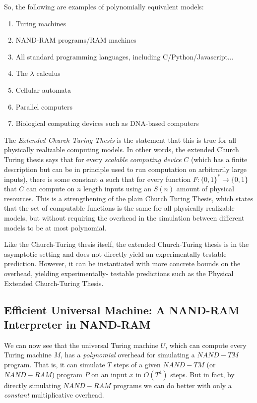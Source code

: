 \documentclass[a4paper, 12pt]{report}
\theoremstyle{remark}
\theoremstyle{definition}
\begin{document}
So, the following are examples of polynomially equivalent models: 
\begin{enumerate}
    \item Turing machines
    \item NAND-RAM programs/RAM machines
    \item All standard programming languages, including C/Python/Javascript...
    \item The $\lambda$ calculus
    \item Cellular automata
    \item Parallel computers
    \item Biological computing devices such as DNA-based computers 
\end{enumerate}

The \textit{Extended Church Turing Thesis} is the statement that this is true for all physically realizable computing models. In other words, the extended Church Turing thesis says that for every \textit{scalable computing device} $C$ (which has a finite description but can be in principle used to run computation on arbitrarily large inputs), there is some constant $a$ such that for every function $F: \{0,1\}^* \longrightarrow \{0,1\}$ that $C$ can compute on $n$ length inputs using an $S(n)$ amount of physical resources. This is a strengthening of the plain Church Turing Thesis, which states that the set of computable functions is the same for all physically realizable models, but without requiring the overhead in the simulation between different models to be at most polynomial. 

Like the Church-Turing thesis itself, the extended Church-Turing thesis is in the asymptotic setting and does not directly yield an experimentally testable prediction. However, it can be instantiated with more concrete bounds on the overhead, yielding experimentally- testable predictions such as the Physical Extended Church-Turing Thesis. 
 
\subsection{Efficient Universal Machine: A NAND-RAM Interpreter in NAND-RAM}
We can now see that the universal Turing machine $U$, which can compute every Turing machine $M$, has a \textit{polynomial} overhead for simulating a $NAND-TM$ program. That is, it can simulate $T$ steps of a given $NAND-TM$ (or $NAND-RAM$) program $P$ on an input $x$ in $O(T^4)$ steps. But in fact, by directly simulating $NAND-RAM$ programs we can do better with only a \textit{constant} multiplicative overhead. 
\end{document}
